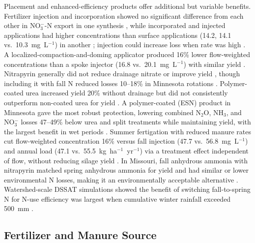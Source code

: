 \documentclass[11pt]{article}
\begin{document}
Placement and enhanced-efficiency products offer additional but variable benefits. Fertilizer injection and incorporation showed no significant difference from each other in NO$_3^-$-N export in one synthesis \parencite{Liu2021}, while incorporated and injected applications had higher concentrations than surface applications (14.2, 14.1 vs.\ 10.3~mg~L$^{-1}$) in another \parencite{Hertzberger2019}; injection could increase loss when rate was high \parencite{Jeong2018}. A localized-compaction-and-doming applicator produced 16\% lower flow-weighted concentrations than a spoke injector (16.8 vs.\ 20.1~mg~L$^{-1}$) with similar yield \parencite{Bakhsh2010}. Nitrapyrin generally did not reduce drainage nitrate or improve yield \parencite{Vetsch2019,Pittelkow2017}, though including it with fall N reduced losses 10--18\% in Minnesota rotations \parencite{Randall2003,Randall2005}. Polymer-coated urea increased yield 20\% without drainage but did not consistently outperform non-coated urea for yield \parencite{Nash2015,Nash2015b}. A polymer-coated (ESN) product in Minnesota gave the most robust protection, lowering combined N$_2$O, NH$_3$, and NO$_3^-$ losses 47--49\% below urea and split treatments while maintaining yield, with the largest benefit in wet periods \parencite{Menegaz2025}. Summer fertigation with reduced manure rates cut flow-weighted concentration 16\% versus fall injection (47.7 vs.\ 56.8~mg~L$^{-1}$) and annual load (47.1 vs.\ 55.5~kg~ha$^{-1}$~yr$^{-1}$) via a treatment effect independent of flow, without reducing silage yield \parencite{Gamble2018}. In Missouri, fall anhydrous ammonia with nitrapyrin matched spring anhydrous ammonia for yield and had similar or lower environmental N losses, making it an environmentally acceptable alternative \parencite{Kaur2024,Kaur2024c}. Watershed-scale DSSAT simulations showed the benefit of switching fall-to-spring N for N-use efficiency was largest when cumulative winter rainfall exceeded 500~mm \parencite{Banger2018}.

\subsection{Fertilizer and Manure Source}
\end{document}
